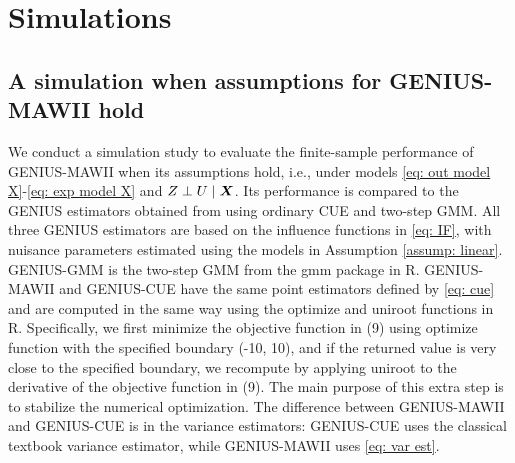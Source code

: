 \documentclass[12pt]{article}
\begin{document}
{%


\vspace{-5mm}

\section{Simulations}
\label{sec: simu}

\vspace{-3mm}
\subsection{A simulation when assumptions for GENIUS-MAWII hold} \label{subsec: simu1}

We conduct a simulation study to evaluate the finite-sample performance of GENIUS-MAWII when its assumptions hold, i.e., under models \eqref{eq: out model X}-\eqref{eq: exp model X} and $Z\perp U\mid \bm{X}$. Its performance is compared to the GENIUS estimators obtained from using ordinary CUE and two-step GMM. All three GENIUS estimators are based on the influence functions in  \eqref{eq: IF}, {with nuisance parameters estimated using the models in Assumption \ref{assump: linear}.}  GENIUS-GMM is the two-step GMM from the \textsf{gmm} package in \textsf{R}. {GENIUS-MAWII and GENIUS-CUE have the same point estimators defined by  \eqref{eq: cue} and are computed in the same way using the  \textsf{optimize} and  \textsf{uniroot} functions in \textsf{R}. Specifically, we first minimize the objective function  in  (9) using \textsf{optimize} function with the specified boundary (-10, 10), and if the returned value is very close to the specified boundary, we recompute by applying \textsf{uniroot} to the derivative of the objective function in  (9). The main purpose of this extra step is to stabilize the numerical optimization. The difference between GENIUS-MAWII and GENIUS-CUE is in the variance estimators: 
GENIUS-CUE uses the classical textbook variance estimator, while GENIUS-MAWII uses \eqref{eq: var est}.}





}
\end{document}
